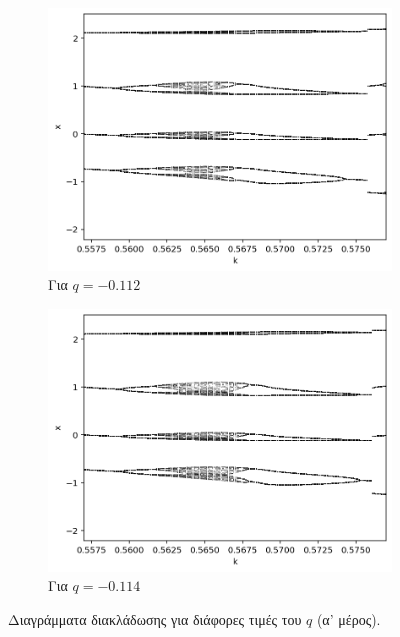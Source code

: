 \begin{figure}[ht]
	\centering
	
	\begin{subfigure}[b]{1\textwidth}
		\centering
		\includegraphics[width=\textwidth]{LateX images/graphs/g3}
		\caption{Για $q=-0.112$}
		\label{f:g3}
	\end{subfigure}
	\hfill
	\begin{subfigure}[b]{1\textwidth}
		\centering
		\includegraphics[width=\textwidth]{LateX images/graphs/g4}
		\caption{Για $q=-0.114$}
		\label{f:g4}
	\end{subfigure}
	\hfill
	\caption{Διαγράμματα διακλάδωσης για διάφορες τιμές του $q$ (α' μέρος). }
\label{f:g211}
\end{figure}
	
